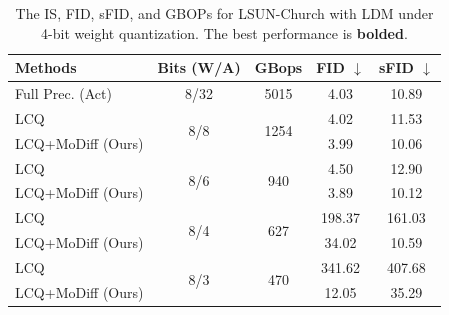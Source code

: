 \begin{table}[t!]
\centering
\caption{The IS, FID, sFID, and GBOPs for LSUN-Church with LDM under 4-bit weight quantization. The best performance is \textbf{bolded}.}
\begin{tabular}{l|c|c|cc}
\toprule
{Methods} & {Bits (W/A)} & GBops & FID $\downarrow$ & sFID $\downarrow$ \\
\midrule
Full Prec. (Act) & 8/32 &{5015} & 4.03 & 10.89 \\
\midrule
LCQ & \multirow{2}{*}{8/8} & \multirow{2}{*}{1254}& 4.02 & 11.53 \\
LCQ+MoDiff (Ours) & & & 3.99 & 10.06 \\
\midrule
LCQ & \multirow{2}{*}{8/6} & \multirow{2}{*}{940}& 4.50 & 12.90 \\
LCQ+MoDiff (Ours) & && 3.89 & 10.12 \\
\midrule
LCQ & \multirow{2}{*}{8/4}&\multirow{2}{*}{627} & 198.37 & 161.03 \\
LCQ+MoDiff (Ours) & && 34.02 & 10.59 \\
\midrule
LCQ & \multirow{2}{*}{8/3}& \multirow{2}{*}{470}& 341.62 & 407.68 \\
LCQ+MoDiff (Ours) && & 12.05 & 35.29 \\
\bottomrule
\end{tabular}
\label{apptab:church_w4}
\end{table}

